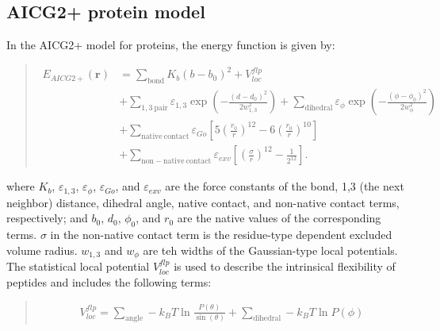 \documentclass[a4paper,11pt,oneside,english]{sphinxmanual}
\begin{document}
\subsection{AICG2+ protein model}
\label{\detokenize{05_Energy:aicg2-protein-model}}
In the AICG2+ model for proteins, the energy function is given by: 
\begin{quote}

\vspace{-5mm}
\begin{equation*}
\begin{split}E_{AICG2+}(\mathbf{r}) & = \sum_{\mathrm{bond}} K_b\left(b - b_{0}\right)^2 + V_{loc}^{flp} \\
     & + \sum_{\mathrm{1,3\ pair}} \varepsilon_{1,3} \exp\left(-\frac{(d-d_0)^2}{2w_{1,3}^2}\right) + \sum_{\mathrm{dihedral}} \varepsilon_{\phi}\exp \left(-\frac{(\phi - \phi_0)^2}{2w_{\phi}^2}\right) \\
     & + \sum_{\mathrm{native\ contact}} \varepsilon_{Go} \left[ 5\left(\frac{r_0}{r}\right)^{12} - 6 \left(\frac{r_0}{r}\right)^{10} \right] \\
     & + \sum_{\mathrm{non-native\ contact}} \varepsilon_{exv} \left[ \left(\frac{\sigma}{r}\right)^{12} - \frac{1}{2^{12}} \right].\end{split}
\end{equation*}
\vspace{-3mm}
\end{quote}

where \(K_{b}\), \(\varepsilon_{1,3}\), \(\varepsilon_{\phi}\),
\(\varepsilon_{Go}\), and \(\varepsilon_{exv}\) are the force constants
of the bond, 1,3 (the next neighbor) distance, dihedral angle, native contact,
and non-native contact terms, respectively; and \(b_{0}\), \(d_{0}\),
\(\phi_0\), and \(r_0\) are the native values of the corresponding
terms.  \(\sigma\) in the non-native contact term is the residue-type
dependent excluded volume radius. \(w_{1,3}\) and \(w_{\phi}\) are teh
widths of the Gaussian-type local potentials.  The statistical local potential
\(V_{loc}^{flp}\) is used to describe the intrinsical flexibility of
peptides and includes the following terms: 
\begin{quote}

\vspace{-5mm}
\begin{equation*}
\begin{split}V_{loc}^{flp} = \sum_{\mathrm{angle}} -k_B T \ln \frac{P(\theta)}{\sin(\theta)}  + \sum_{\mathrm{dihedral}} - k_B T \ln P(\phi)\end{split}
\end{equation*}
\vspace{-3mm}
\end{quote}
\end{document}

